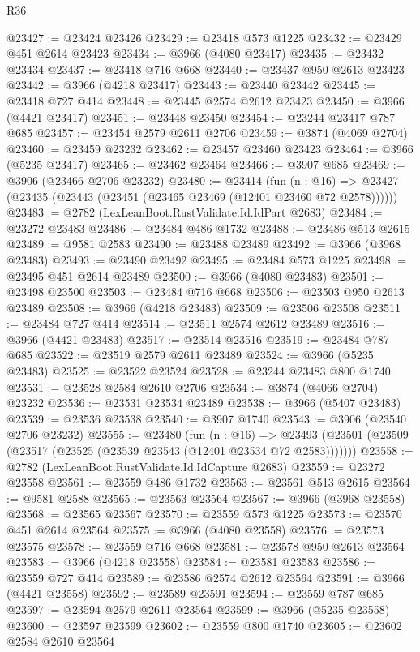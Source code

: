 \begin{lexlean}{R36}
\begin{coremodule}
@23427 := @23424 @23426
@23429 := @23418 @573 @1225
@23432 := @23429 @451 @2614 @23423
@23434 := @3966 (@4080 @23417)
@23435 := @23432 @23434
@23437 := @23418 @716 @668
@23440 := @23437 @950 @2613 @23423
@23442 := @3966 (@4218 @23417)
@23443 := @23440 @23442
@23445 := @23418 @727 @414
@23448 := @23445 @2574 @2612 @23423
@23450 := @3966 (@4421 @23417)
@23451 := @23448 @23450
@23454 := @23244 @23417 @787 @685
@23457 := @23454 @2579 @2611 @2706
@23459 := @3874 (@4069 @2704)
@23460 := @23459 @23232
@23462 := @23457 @23460 @23423
@23464 := @3966 (@5235 @23417)
@23465 := @23462 @23464
@23466 := @3907 @685
@23469 := @3906 (@23466 @2706 @23232)
@23480 := @23414
    (fun (n : @16) => @23427 (@23435 (@23443 (@23451 (@23465 @23469 (@12401 @23460 @72 @2578))))))
@23483 := @2782 (LexLeanBoot.RustValidate.Id.IdPart @2683)
@23484 := @23272 @23483
@23486 := @23484 @486 @1732
@23488 := @23486 @513 @2615
@23489 := @9581 @2583
@23490 := @23488 @23489
@23492 := @3966 (@3968 @23483)
@23493 := @23490 @23492
@23495 := @23484 @573 @1225
@23498 := @23495 @451 @2614 @23489
@23500 := @3966 (@4080 @23483)
@23501 := @23498 @23500
@23503 := @23484 @716 @668
@23506 := @23503 @950 @2613 @23489
@23508 := @3966 (@4218 @23483)
@23509 := @23506 @23508
@23511 := @23484 @727 @414
@23514 := @23511 @2574 @2612 @23489
@23516 := @3966 (@4421 @23483)
@23517 := @23514 @23516
@23519 := @23484 @787 @685
@23522 := @23519 @2579 @2611 @23489
@23524 := @3966 (@5235 @23483)
@23525 := @23522 @23524
@23528 := @23244 @23483 @800 @1740
@23531 := @23528 @2584 @2610 @2706
@23534 := @3874 (@4066 @2704) @23232
@23536 := @23531 @23534 @23489
@23538 := @3966 (@5407 @23483)
@23539 := @23536 @23538
@23540 := @3907 @1740
@23543 := @3906 (@23540 @2706 @23232)
@23555 := @23480
    (fun (n : @16) =>
    @23493 (@23501 (@23509 (@23517 (@23525 (@23539 @23543 (@12401 @23534 @72 @2583)))))))
@23558 := @2782 (LexLeanBoot.RustValidate.Id.IdCapture @2683)
@23559 := @23272 @23558
@23561 := @23559 @486 @1732
@23563 := @23561 @513 @2615
@23564 := @9581 @2588
@23565 := @23563 @23564
@23567 := @3966 (@3968 @23558)
@23568 := @23565 @23567
@23570 := @23559 @573 @1225
@23573 := @23570 @451 @2614 @23564
@23575 := @3966 (@4080 @23558)
@23576 := @23573 @23575
@23578 := @23559 @716 @668
@23581 := @23578 @950 @2613 @23564
@23583 := @3966 (@4218 @23558)
@23584 := @23581 @23583
@23586 := @23559 @727 @414
@23589 := @23586 @2574 @2612 @23564
@23591 := @3966 (@4421 @23558)
@23592 := @23589 @23591
@23594 := @23559 @787 @685
@23597 := @23594 @2579 @2611 @23564
@23599 := @3966 (@5235 @23558)
@23600 := @23597 @23599
@23602 := @23559 @800 @1740
@23605 := @23602 @2584 @2610 @23564

\end{coremodule}
\end{lexlean}
